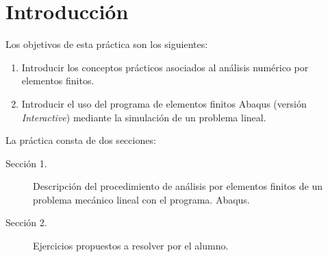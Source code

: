 \section*{Introducción}
 Los objetivos de esta
práctica son los siguientes:
\begin{enumerate}
\item Introducir los conceptos prácticos asociados al análisis
  numérico por elementos finitos.
\item Introducir el uso del programa de elementos finitos Abaqus
  (versión \textit{Interactive}) mediante la simulación de un problema
  lineal.

\end{enumerate}

La práctica consta de dos secciones:
\begin{description}
\item[Sección 1.] Descripción del procedimiento de análisis por
  elementos finitos de un problema mecánico lineal con el programa.
  Abaqus.
\item[Sección 2.] Ejercicios propuestos a resolver por el alumno.
\end{description}